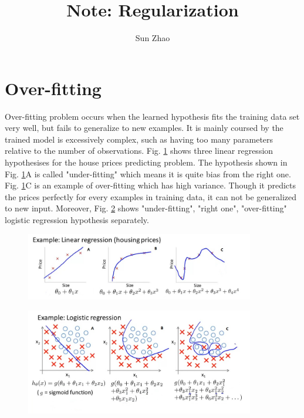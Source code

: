 \documentclass{article}
\title{Note: Regularization}
\author{Sun Zhao}
\begin{document}
\maketitle
\newpage

\section{Over-fitting}
Over-fitting problem occurs when the learned hypothesis fits the training data set very well, but fails to generalize to new examples. It is mainly coursed by the trained model is excessively complex, such as having too many parameters relative to the number of observations. Fig. \ref{over-fitting_linear_regression_example} shows three linear regression hypothesises for the house prices predicting problem. The hypothesis shown in Fig. \ref{over-fitting_linear_regression_example}A is called "under-fitting" which means it is quite bias from the right one. Fig. \ref{over-fitting_linear_regression_example}C is an example of over-fitting which has high variance. Though it predicts the prices perfectly for every examples in training data, it can not be generalized to new input. Moreover, Fig. \ref{over-fitting_logistic_regression_example} shows "under-fitting", "right one", "over-fitting" logistic regression hypothesis separately.

\begin{figure}[ht]
  \centering
  \includegraphics[width=10cm]{Figure1.jpg}\\
  \caption{}\label{over-fitting_linear_regression_example}
\end{figure}

\begin{figure}[ht]
  \centering
  \includegraphics[width=10cm]{Figure2.jpg}\\
  \caption{}\label{over-fitting_logistic_regression_example}
\end{figure}
\end{document}
